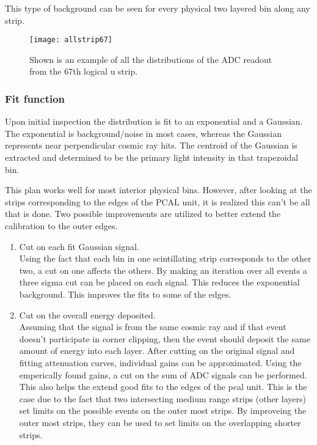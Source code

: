 This type of background can be seen for every physical two layered bin along any strip.

\begin{figure}[h]
    \centering
    \texttt{[image: allstrip67]}
    \caption{Shown is an example of all the distributions of the ADC readout from the 67th logical u strip.}
    \label{fig:allstrip67}
\end{figure}


\FloatBarrier
\subsubsection{Fit function}
Upon initial inspection the distribution is fit to an exponential and a Gaussian. 
The exponential is background/noise in most cases, whereas the Gaussian represents near perpendicular cosmic ray hits. 
The centroid of the Gaussian is extracted and determined to be the primary light intensity in that trapezoidal bin.

This plan works well for most interior physical bins. However, after looking at the strips corresponding to 
the edges of the PCAL unit, it is realized this can't be all that is done. Two possible improvements are 
utilized to better extend the calibration to the outer edges.

\begin{enumerate}
    \item Cut on each fit Gaussian signal. \\
        Using the fact that each bin in one scintillating strip corresponds to the other two, a cut on one 
        affects the others. By making an iteration over all events a three sigma cut can be placed on each
         signal. This reduces the exponential background. This improves the fits to some of the edges.
    \item Cut on the overall energy deposited. \\
        Assuming that the signal is from the same cosmic ray and if that event doesn't participate in 
        corner clipping, then the event should deposit the same amount of energy into each layer. After
         cutting on the original signal and fitting attenuation curves, individual gains can be 
         approximated. Using the emperically found gains, a cut on the sum of ADC signals can be 
         performed. This also helps the extend good fits to the edges of the pcal unit. This is 
         the case due to the fact that two intersecting medium range strips (other layers) set 
         limits on the possible events on the outer most strips. By improveing the outer most strips,
          they can be used to set limits on the overlapping shorter strips.  
\end{enumerate}

